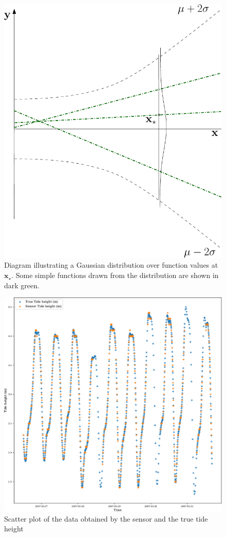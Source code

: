 \documentclass[10pt]{article}
\begin{document}
\begin{figure}[H]
\centering
\includegraphics[width=0.4\linewidth]{function_distribution_cropped}
\caption{Diagram illustrating a Gaussian distribution over function values at $\mathbf{x}_{\star}$. Some simple functions drawn
from the distribution are shown in dark green.}\label{fig:func_distribution}
\end{figure}
\begin{figure}[H]
    \centering
    \includegraphics[width=0.5\linewidth]{sensor_scatter_cropped}
    \caption{Scatter plot of the data obtained by the sensor and the true tide height}\label{fig:scatter}
\end{figure}
\end{document}
